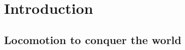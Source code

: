 \documentclass[main]{subfiles}
\begin{document}
\setcounter{chapter}{0}

\chapter{Introduction} %

\label{Chapter\thechapter} %


\section{Locomotion to conquer the world}
\end{document}
